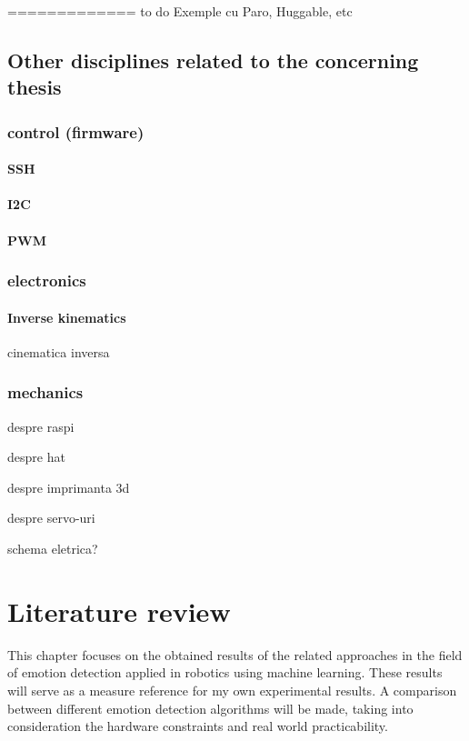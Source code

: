 \documentclass[runningheads,a4paper,12pt]{report}
\begin{document}
============= to do
Exemple cu Paro, Huggable, etc

\section{Other disciplines related to the concerning thesis}

\subsection{control (firmware)}
\subsubsection{SSH}
\label{section:ssh}
\subsubsection{I2C}
\label{section:i2c}
\subsubsection{PWM}
\label{section:pwm}

\subsection{electronics}
\label{section:servomotor}

\subsubsection*{Inverse kinematics}
\label{section:inverse-kinematics}
cinematica inversa

\subsection{mechanics}
despre raspi

despre hat

despre imprimanta 3d

despre servo-uri

schema eletrica?

\chapter{Literature review}
\label{chapter:literature}
This chapter focuses on the obtained results of the related approaches in the field of emotion detection applied in robotics using machine learning. These results will serve as a measure reference for my own experimental results. A comparison between different emotion detection algorithms will be made, taking into consideration the hardware constraints and real world practicability. 
\end{document}

